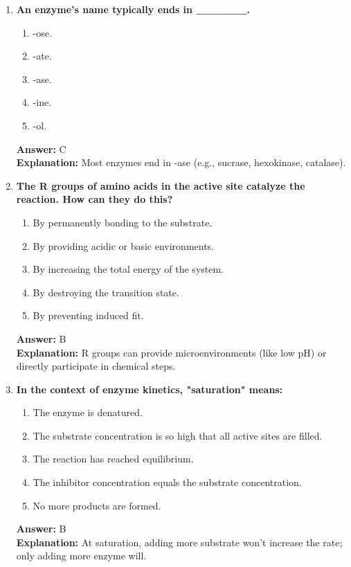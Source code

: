 \documentclass[11pt, a4paper]{article}
\begin{document}
\begin{enumerate}[leftmargin=*, label=\arabic*.]
\item \textbf{An enzyme's name typically ends in \_\_\_\_\_\_.}
\begin{enumerate}[label=\Alph*.]
    \item -ose.
    \item -ate.
    \item -ase.
    \item -ine.
    \item -ol.
\end{enumerate}
\textbf{Answer:} C \\
\textbf{Explanation:} Most enzymes end in -ase (e.g., sucrase, hexokinase, catalase).

\item \textbf{The R groups of amino acids in the active site catalyze the reaction. How can they do this?}
\begin{enumerate}[label=\Alph*.]
    \item By permanently bonding to the substrate.
    \item By providing acidic or basic environments.
    \item By increasing the total energy of the system.
    \item By destroying the transition state.
    \item By preventing induced fit.
\end{enumerate}
\textbf{Answer:} B \\
\textbf{Explanation:} R groups can provide microenvironments (like low pH) or directly participate in chemical steps.

\item \textbf{In the context of enzyme kinetics, "saturation" means:}
\begin{enumerate}[label=\Alph*.]
    \item The enzyme is denatured.
    \item The substrate concentration is so high that all active sites are filled.
    \item The reaction has reached equilibrium.
    \item The inhibitor concentration equals the substrate concentration.
    \item No more products are formed.
\end{enumerate}
\textbf{Answer:} B \\
\textbf{Explanation:} At saturation, adding more substrate won't increase the rate; only adding more enzyme will.


\end{enumerate}
\end{document}
